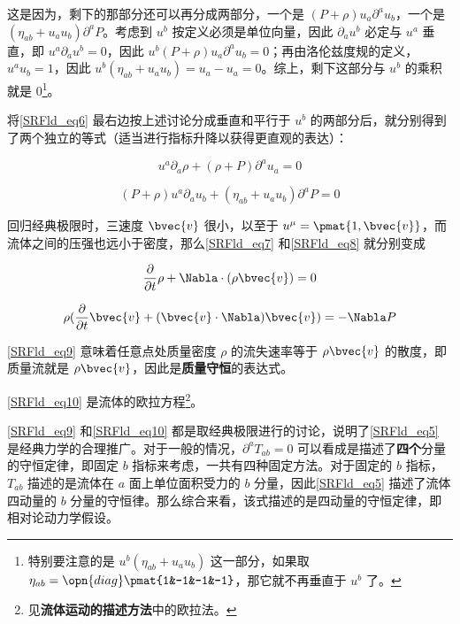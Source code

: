 这是因为，剩下的那部分还可以再分成两部分，一个是 $(P+\rho)u_a\partial^au_b$，一个是 $(\eta_{ab}+u_au_b)\partial^aP$。考虑到 $u^b$ 按定义必须是单位向量，因此 $\partial_au^b$ 必定与 $u^a$ 垂直，即 $u^a\partial_au^b=0$，因此 $u^b(P+\rho)u_a\partial^au_b=0$；再由洛伦兹度规的定义，$u^au_b=1$，因此 $u^b(\eta_{ab}+u_au_b)=u_a-u_a=0$。综上，剩下这部分与 $u^b$ 的乘积就是 $0$\footnote{特别要注意的是 $u^b(\eta_{ab}+u_au_b)$ 这一部分，如果取 $\eta_{ab}=\opn{diag}\pmat{1&-1&-1&-1}$，那它就不再垂直于 $u^b$ 了。}。

将\autoref{SRFld_eq6} 最右边按上述讨论分成垂直和平行于 $u^b$ 的两部分后，就分别得到了两个独立的等式（适当进行指标升降以获得更直观的表达）：

\begin{equation}\label{SRFld_eq7}
u^a\partial_a\rho+(\rho+P)\partial^au_a=0
\end{equation}

\begin{equation}\label{SRFld_eq8}
(P+\rho)u^a\partial_au_b+(\eta_{ab}+u_au_b)\partial^aP=0
\end{equation}

回归经典极限时，三速度 $\bvec{v}$ 很小，以至于 $u^\mu=\pmat{1, \bvec{v}}$，而流体之间的压强也远小于密度，那么\autoref{SRFld_eq7} 和\autoref{SRFld_eq8} 就分别变成

\begin{equation}\label{SRFld_eq9}
\frac{\partial}{\partial t}\rho+\Nabla\cdot(\rho\bvec{v})=0
\end{equation}

\begin{equation}\label{SRFld_eq10}
\rho(\frac{\partial}{\partial t}\bvec{v}+(\bvec{v}\cdot\Nabla)\bvec{v})=-\Nabla P
\end{equation}

\autoref{SRFld_eq9} 意味着任意点处质量密度 $\rho$ 的流失速率等于 $\rho\bvec{v}$ 的散度，即质量流就是 $\rho\bvec{v}$，因此是\textbf{质量守恒}的表达式。

\autoref{SRFld_eq10} 是流体的欧拉方程\footnote{见\textbf{流体运动的描述方法}中的欧拉法。}。

\autoref{SRFld_eq9} 和\autoref{SRFld_eq10} 都是取经典极限进行的讨论，说明了\autoref{SRFld_eq5} 是经典力学的合理推广。对于一般的情况，$\partial^aT_{ab}=0$ 可以看成是描述了\textbf{四个}分量的守恒定律，即固定 $b$ 指标来考虑，一共有四种固定方法。对于固定的 $b$ 指标，$T_{ab}$ 描述的是流体在 $a$ 面上单位面积受力的 $b$ 分量，因此\autoref{SRFld_eq5} 描述了流体四动量的 $b$ 分量的守恒律。那么综合来看，该式描述的是四动量的守恒定律，即相对论动力学假设。







